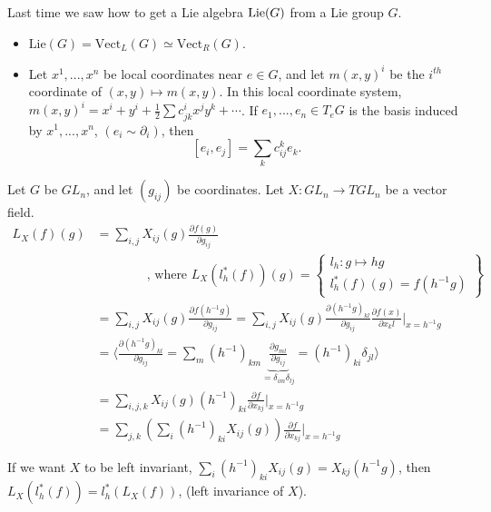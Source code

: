   \setcounter{lecture}{3}

 Last time we saw how to get a Lie algebra $\operatorname{Lie}(G)$ from a Lie group $G$.

 \begin{itemize}
 \item[] $\mathrm{Lie}(G)=\mathrm{Vect}_L(G)\simeq \mathrm{Vect}_R(G)$.

 \item[] Let $x^1,...,x^n$ be local coordinates near $e\in G$, and let  $m(x,y)^i$
 be the $i^{th}$ coordinate of $(x,y) \mapsto m(x,y)$. In this local coordinate
 system, $m(x,y)^i = x^i + y^i + \frac{1}{2} \sum c^i_{jk} x^j y^k + \cdots$. If
 $e_1,...,e_n \in T_eG$ is the basis induced by $x^1,...,x^n$, $(e_i \sim
 \partial_i)$, then
 \[
 [e_i,e_j] = \sum_k c_{ij}^k e_k.
 \]
 \end{itemize}

 \begin{example} Let $G$ be $GL_n$, and let $(g_{ij})$ be coordinates.
 Let $X:GL_n\rightarrow TGL_n$ be a vector field.
 \begin{align*}
 L_X(f)(g) &=
 \sum_{i,j} X_{ij}(g)\frac{\partial f(g)}{\partial g_{ij}} \\
    &\qquad \qquad \text{, where } L_X(l_h^*(f))(g) = \left\{
            \begin{array}{l} l_h:g\mapsto hg \\
                        l_h^*(f)(g) = f(h^{-1}g)
            \end{array} \right\} \\
 &= \sum_{i,j} X_{ij}(g) \frac{\partial f(h^{-1}g)}{\partial g_{ij}}
    = \sum_{i,j} X_{ij} (g) \frac{\partial (h^{-1}g)_{kl}}{\partial
    g_{ij}} \frac{\partial f(x)}{\partial x_kl} |_{x=h^{-1}g} \\
 &= \langle \frac{\partial(h^{-1}g)_{kl}}{\partial g_{ij}} = \sum_m
    (h^{-1})_{km}\underbrace{\frac{\partial g_{ml}}{\partial
    g_{ij}}}_{=\delta_{im}\delta_{lj}} = (h^{-1})_{ki}\delta_{jl} \rangle \\
 &= \sum_{i,j,k} X_{ij}(g)(h^{-1})_{ki} \frac{\partial f}{\partial
    x_{kj}}|_{x=h^{-1}g} \\
 &= \sum_{j,k} \left( \sum_i
    (h^{-1})_{ki}X_{ij}(g)\right) \frac{\partial f}{\partial x_{kj}}|_{x=h^{-1}g}
 \end{align*}
 \end{example}

 If we want $X$ to be left invariant,
 $\sum_i(h^{-1})_{ki}X_{ij}(g)=X_{kj}(h^{-1}g)$, then $L_X(l_h^*(f))
 = l_h^*(L_X(f))$, (left invariance of $X$).

